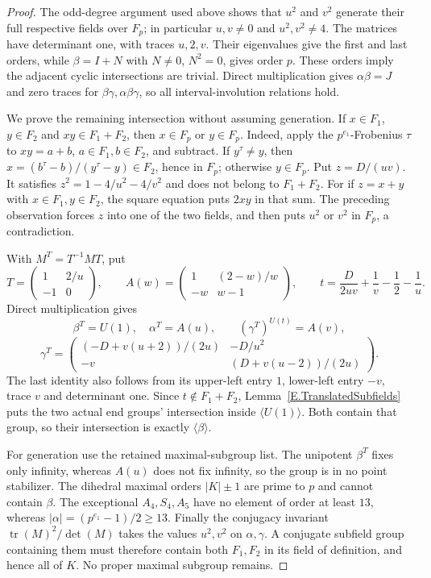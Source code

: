 \begin{proof}
The odd-degree argument used above shows that $u^2$ and $v^2$ generate
their full respective fields over $F_p$; in particular $u,v\ne0$ and
$u^2,v^2\ne4$. The matrices have determinant one, with traces $u,2,v$.
Their eigenvalues give the first and last orders, while $\beta=I+N$
with $N\ne0$, $N^2=0$, gives order $p$. These orders imply the adjacent
cyclic intersections are trivial. Direct multiplication gives
$\alpha\beta=J$ and zero traces for $\beta\gamma,\alpha\beta\gamma$,
so all interval-involution relations hold.

We prove the remaining intersection without assuming generation.
If $x\in F_1$, $y\in F_2$ and $xy\in F_1+F_2$, then $x\in F_p$
or $y\in F_p$. Indeed, apply the $p^{e_1}$-Frobenius $\tau$ to
$xy=a+b$, $a\in F_1,b\in F_2$, and subtract. If $y^\tau\ne y$,
then $x=(b^\tau-b)/(y^\tau-y)\in F_2$, hence in $F_p$; otherwise
$y\in F_p$. Put $z=D/(uv)$. It satisfies
$z^2=1-4/u^2-4/v^2$ and does not belong to $F_1+F_2$.
For if $z=x+y$ with $x\in F_1,y\in F_2$, the square equation puts
$2xy$ in that sum. The preceding observation forces $z$ into one of
the two fields, and then puts $u^2$ or $v^2$ in $F_p$, a contradiction.

With $M^T=T^{-1}MT$, put
\[
 T=\begin{pmatrix}1&2/u\\-1&0\end{pmatrix},\qquad
 A(w)=\begin{pmatrix}1&(2-w)/w\\-w&w-1\end{pmatrix},\qquad
 t=\frac D{2uv}+\frac1v-\frac12-\frac1u.
\]
Direct multiplication gives
\[
 \beta^T=U(1),\quad\alpha^T=A(u),\qquad(\gamma^T)^{U(t)}=A(v),
\]\[
 \gamma^T=\begin{pmatrix}
 (-D+v(u+2))/(2u)&-D/u^2\\-v&(D+v(u-2))/(2u)
 \end{pmatrix}.
\]
The last identity also follows from its upper-left entry $1$, lower-left
entry $-v$, trace $v$ and determinant one. Since $t\notin F_1+F_2$,
Lemma~\ref{E.TranslatedSubfields} puts the two actual end groups'
intersection inside $\langle U(1)\rangle$. Both contain that group,
so their intersection is exactly $\langle\beta\rangle$.

For generation use the retained maximal-subgroup list. The unipotent
$\beta^T$ fixes only infinity, whereas $A(u)$ does not fix infinity,
so the group is in no point stabilizer. The dihedral maximal orders
$|K|\pm1$ are prime to $p$ and cannot contain $\beta$. The exceptional
$A_4,S_4,A_5$ have no element of order at least $13$, whereas
$|\alpha|=(p^{e_1}-1)/2\ge13$. Finally the conjugacy invariant
$\operatorname{tr}(M)^2/\det(M)$ takes the values $u^2,v^2$ on
$\alpha,\gamma$. A conjugate subfield group containing them must
therefore contain both $F_1,F_2$ in its field of definition, and hence
all of $K$. No proper maximal subgroup remains.


\end{proof}
